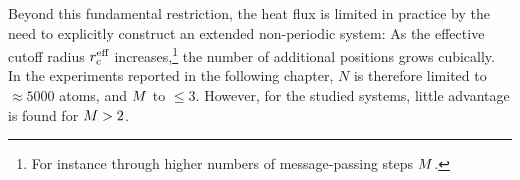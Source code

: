 Beyond this fundamental restriction, the  heat flux is limited in practice by the need to explicitly construct an extended non-periodic system: As the effective cutoff radius $r_{\text{c}}^{\text{eff}}$ increases,\footnote{For instance through higher numbers of message-passing steps $M$.} the number of additional positions grows cubically. In the experiments reported in the following chapter, $N$ is therefore limited to $\approx\num{5000}$ atoms, and $M$ to $\leq3$. However, for the studied systems, little advantage is found for $M > 2$.
